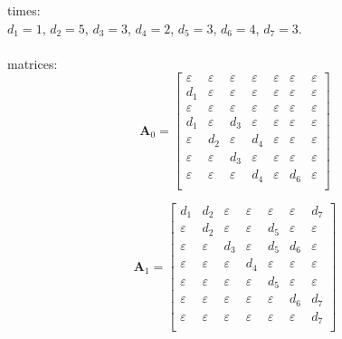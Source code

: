 \documentclass[11pt, a4paper, fleqn]{article}
\begin{document}
times:\\
$d_1 = 1$, $d_2 = 5$, $d_3 = 3$, $d_4 = 2$, $d_5 = 3$, $d_6 = 4$, $d_7 = 3$.\\
\\
matrices:
\begin{equation*}
\mathbf{A}_{0} = 
\left[\begin{array}{ ccccccc }
\varepsilon	&\varepsilon	&\varepsilon	&\varepsilon	&\varepsilon	&\varepsilon	&\varepsilon\\
d_1	&\varepsilon	&\varepsilon	&\varepsilon	&\varepsilon	&\varepsilon	&\varepsilon\\
\varepsilon	&\varepsilon	&\varepsilon	&\varepsilon	&\varepsilon	&\varepsilon	&\varepsilon\\
d_1	&\varepsilon	&d_3	&\varepsilon	&\varepsilon	&\varepsilon	&\varepsilon\\
\varepsilon	&d_2	&\varepsilon	&d_4	&\varepsilon	&\varepsilon	&\varepsilon\\
\varepsilon	&\varepsilon	&d_3	&\varepsilon	&\varepsilon	&\varepsilon	&\varepsilon\\
\varepsilon	&\varepsilon	&\varepsilon	&d_4	&\varepsilon	&d_6	&\varepsilon\\
\end{array}\right]
\end{equation*}

\begin{equation*}
\mathbf{A}_{1} = 
\left[\begin{array}{ ccccccc }
d_1	&d_2	&\varepsilon	&\varepsilon	&\varepsilon	&\varepsilon	&d_7\\
\varepsilon	&d_2	&\varepsilon	&\varepsilon	&d_5	&\varepsilon	&\varepsilon\\
\varepsilon	&\varepsilon	&d_3	&\varepsilon	&d_5	&d_6	&\varepsilon\\
\varepsilon	&\varepsilon	&\varepsilon	&d_4	&\varepsilon	&\varepsilon	&\varepsilon\\
\varepsilon	&\varepsilon	&\varepsilon	&\varepsilon	&d_5	&\varepsilon	&\varepsilon\\
\varepsilon	&\varepsilon	&\varepsilon	&\varepsilon	&\varepsilon	&d_6	&d_7\\
\varepsilon	&\varepsilon	&\varepsilon	&\varepsilon	&\varepsilon	&\varepsilon	&d_7\\
\end{array}\right]
\end{equation*}
\end{document}
